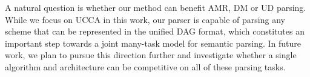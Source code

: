 \documentclass[11pt,a4paper]{article}
\begin{document}
A natural question is whether our method can benefit AMR, DM or UD parsing.
While we focus on UCCA in this work, our parser is capable of parsing any
scheme that can be represented in the unified DAG format, which constitutes
an important step towards a joint many-task model for semantic parsing.
In future work, we plan to pursue this direction further and investigate whether a single
algorithm and architecture can be competitive on all of these parsing tasks.




\end{document}
